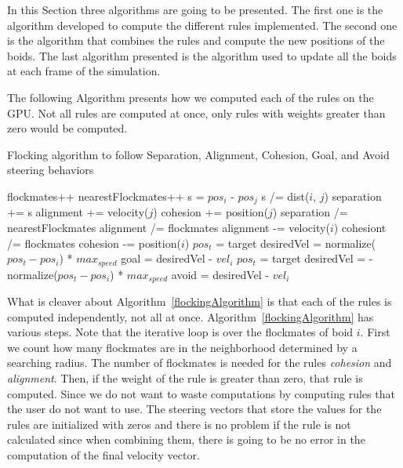 In this Section three algorithms are going to be presented. The first one is the algorithm developed to compute the different rules implemented. The second one is the algorithm that combines the rules and compute the new positions of the boids. The last algorithm presented is the algorithm used to update all the boids at each frame of the simulation. 


The following Algorithm presents how we computed each of the rules on the GPU. Not all rules are computed at once, only rules with weights greater than zero would be computed.

\begin{algorithm}
\caption{Flocking algorithm to follow Separation, Alignment, Cohesion, Goal, and Avoid steering behaviors}
\label{flockingAlgorithm}
\begin{algorithmic}
	\STATE flockmates++
				\STATE nearestFlockmates++
				\STATE s = $pos_i$ - $pos_j$ 
				\STATE s /= dist($i$, $j$) 
				\STATE separation += s
			\ENDIF
		\ENDIF
			\STATE alignment += velocity($j$)
		\ENDIF
			\STATE cohesion += position($j$)
		\ENDIF
	\ENDIF
\ENDFOR
{}
	\STATE separation /= nearestFlockmates
\ENDIF
{}
	\STATE alignment /=  flockmates
	\STATE alignment -= velocity($i$)
\ENDIF
{}
	\STATE cohesiont /=  flockmates
	\STATE cohesion -= position($i$)
\ENDIF
{}
	\STATE $pos_t$ = target
	\STATE desiredVel = normalize($pos_t - pos_i$) * $max_{speed}$
	\STATE goal = desiredVel - $vel_i$
\ENDIF
{}
	\STATE $pos_t$ = target
	\STATE desiredVel = -normalize($pos_t - pos_i$) * $max_{speed}$
	\STATE avoid = desiredVel - $vel_i$
\ENDIF

\end{algorithmic}
\end{algorithm}

What is cleaver about Algorithm~\ref{flockingAlgorithm} is that each of the rules is computed independently, not all at once. Algorithm~\ref{flockingAlgorithm} has various steps. Note that the iterative loop is over the flockmates of boid $i$. First we count how many flockmates are in the neighborhood determined by a searching radius. The number of flockmates is needed for the rules \textit{cohesion} and \textit{alignment}. Then, if the weight of the rule is greater than zero, that rule is computed. Since we do not want to waste computations by computing rules that the user do not want to use. The steering vectors that store the values for the rules are initialized with zeros and there is no problem if the rule is not calculated since when combining them, there is going to be no error in the computation of the final velocity vector.

